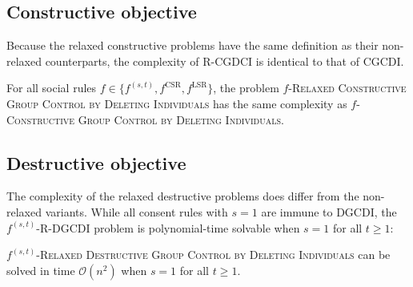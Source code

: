 \documentclass[
    12pt,               %
    a4paper,            %
    bibtotoc,           %
    pointlessnumbers,   %
    ngerman,            %
    titlepage,          %
    leqno,              %
    ]{scrarticle}       %
\begin{document}
\subsection{Constructive objective}

Because the relaxed constructive problems have the same definition as their non-relaxed counterparts, the complexity of R-CGDCI is identical to that of CGCDI.

\begin{Observation} \label{obs:f_rcgcdi}
For all social rules $f \in \{ f^{(s, t)}, f^{\text{CSR}}, f^{\text{LSR}} \}$, the problem $f$-\textsc{Relaxed Constructive Group Control by Deleting Individuals} has the same complexity as $f$-\textsc{Constructive Group Control by Deleting Individuals}.
\end{Observation}



\subsection{Destructive objective}

The complexity of the relaxed destructive problems does differ from the non-relaxed variants. While all consent rules with $s=1$ are immune to DGCDI, the $f^{(s, t)}$-R-DGCDI problem is polynomial-time solvable when $s=1$ for all $t \geq 1$:

\begin{Theorem} \label{thm:fst_rdgcdi_p}
$f^{(s, t)}$-\textsc{Relaxed Destructive Group Control by Deleting Individuals} can be solved in time $\mathcal{O}(n^2)$ when $s=1$ for all $t \geq 1$.
\end{Theorem}
\end{document}
